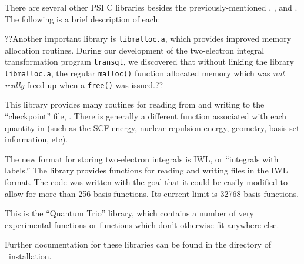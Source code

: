 %
%
%
%
There are several other PSI C libraries besides the previously-mentioned
, , and .
The following is a brief description of each:

??Another important library is {\tt libmalloc.a}, which provides improved memory allocation
routines. During our development of the two-electron integral
transformation program {\tt transqt}, we discovered that without
linking the library {\tt libmalloc.a}, the regular {\tt malloc()}
function allocated memory which was {\em not really} freed up when
a {\tt free()} was issued.??

\begin{description}
\item{} This library provides many routines for reading 
from and writing to the ``checkpoint'' file, .  There is
generally a different function associated with each quantity in 
(such as the SCF energy, nuclear repulsion energy, geometry,
basis set information, etc).

\item{} The new format for storing two-electron integrals is
IWL, or ``integrals with labels.''  The library  provides functions for
reading and writing files in the IWL format.  The code was written with 
the goal that it could be easily modified to allow for more than 256
basis functions. Its current limit is 32768 basis functions.

\item{} This is the ``Quantum Trio'' library, which contains a number
of very experimental functions or functions which don't otherwise
fit anywhere else.
\end{description}

Further documentation for these libraries can be found in the 
directory of \PSIthree\ installation.
